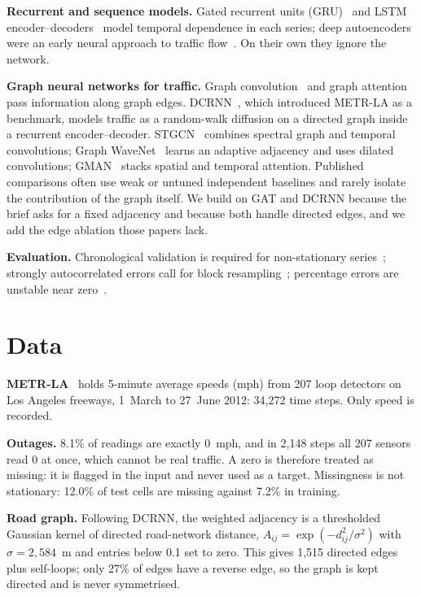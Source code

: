 \documentclass[conference]{IEEEtran}
\begin{document}
\textbf{Recurrent and sequence models.} Gated recurrent units (GRU)~\cite{cho2014gru} and LSTM encoder--decoders~\cite{sutskever2014} model temporal dependence in each series; deep autoencoders were an early neural approach to traffic flow~\cite{lv2015}. On their own they ignore the network.

\textbf{Graph neural networks for traffic.} Graph convolution~\cite{kipf2017gcn} and graph attention~\cite{velickovic2018gat} pass information along graph edges. DCRNN~\cite{li2018dcrnn}, which introduced METR-LA as a benchmark, models traffic as a random-walk diffusion on a directed graph inside a recurrent encoder--decoder. STGCN~\cite{yu2018stgcn} combines spectral graph and temporal convolutions; Graph WaveNet~\cite{wu2019graphwavenet} learns an adaptive adjacency and uses dilated convolutions; GMAN~\cite{zheng2020gman} stacks spatial and temporal attention. Published comparisons often use weak or untuned independent baselines and rarely isolate the contribution of the graph itself. We build on GAT and DCRNN because the brief asks for a fixed adjacency and because both handle directed edges, and we add the edge ablation those papers lack.

\textbf{Evaluation.} Chronological validation is required for non-stationary series~\cite{cerqueira2020}; strongly autocorrelated errors call for block resampling~\cite{kunsch1989}; percentage errors are unstable near zero~\cite{hyndman2006}.

\section{Data}
\textbf{METR-LA}~\cite{li2018dcrnn} holds 5-minute average speeds (mph) from 207 loop detectors on Los Angeles freeways, 1~March to 27~June 2012: 34{,}272 time steps. Only speed is recorded.

\textbf{Outages.} 8.1\% of readings are exactly 0~mph, and in 2{,}148 steps all 207 sensors read 0 at once, which cannot be real traffic. A zero is therefore treated as missing: it is flagged in the input and never used as a target. Missingness is not stationary: 12.0\% of test cells are missing against 7.2\% in training.

\textbf{Road graph.} Following DCRNN, the weighted adjacency is a thresholded Gaussian kernel of directed road-network distance, $A_{ij}=\exp(-d_{ij}^2/\sigma^2)$ with $\sigma=2{,}584$~m and entries below 0.1 set to zero. This gives 1{,}515 directed edges plus self-loops; only 27\% of edges have a reverse edge, so the graph is kept directed and is never symmetrised.
\end{document}
